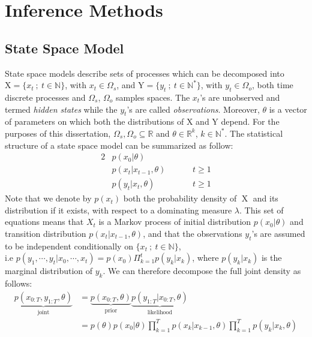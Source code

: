 \documentclass[12pt]{article}
\begin{document}
	\section{Inference Methods}
	\subsection{State Space Model}
	State space models describe sets of processes which can be decomposed into $\mathrm{X}=\{x_t \ ; \ t \in \mathbb{N}\}$, with $x_t \in \Omega_s$, and $\mathrm{Y}=\{y_t \ ; \ t \in \mathbb{N^*}\}$, with $y_t \in \Omega_o$, both time discrete processes and $\Omega_s$, $\Omega_o$ samples spaces. The $x_t$'s are unobserved and termed \emph{hidden states} while the $y_t$'s are called \emph{observations}. Moreover, $\theta$ is a vector of parameters on which both the distributions of $\mathrm{X}$ and $\mathrm{Y}$ depend. For the purposes of this dissertation, $\Omega_s, \Omega_o \subseteq \mathbb{R}$ and $\theta \in \mathbb{R}^k$, $k \in \mathbb{N^*}$. The statistical structure of a state space model can be summarized as follow: 
	\begin{alignat}{2}
	& p(x_0| \theta) &\\
	& p(x_t | x_{t-1}, \theta) \hspace{1cm} & t \ge 1\\
	& p(y_t | x_t, \theta)  & t \ge 1
	\end{alignat}
	Note that we denote by $p(x_t)$ both the probability density of $\operatorname{X}$ and its distribution if it exists, with respect to a dominating measure $\lambda$. This set of equations means that $X_t$ is a Markov process of initial distribution $p(x_0| \theta)$ and transition distribution $p(x_t | x_{t-1}, \theta)$, and that the observations $y_t$'s are assumed to be independent conditionally on $\{x_t \ ; \ t \in \mathbb{N}\}$, \\ i.e $p(y_1, \cdots, y_t | x_0, \cdots, x_t) =p(x_0)\Pi_{k=1}^t p(y_k | x_k)$, where $p(y_k | x_k)$ is the marginal distribution of $y_k$. We can therefore decompose the full joint density as follows:
	\begin{align}
	\underbrace{p(x_{0:T}, y_{1:T}, \theta)}_{\text{joint}} & = \underbrace{p(x_{0:T}, \theta)}_{\text{prior}}\underbrace{p(y_{1:T}| x_{0:T}, \theta)}_{\text{likelihood}} \\
		& = p(\theta)p(x_0| \theta)\prod_{k=1}^{T}p(x_k|x_{k-1}, \theta)\prod_{k=1}^{T}p(y_k|x_k, \theta)
	\end{align}\\
	
\end{document}
